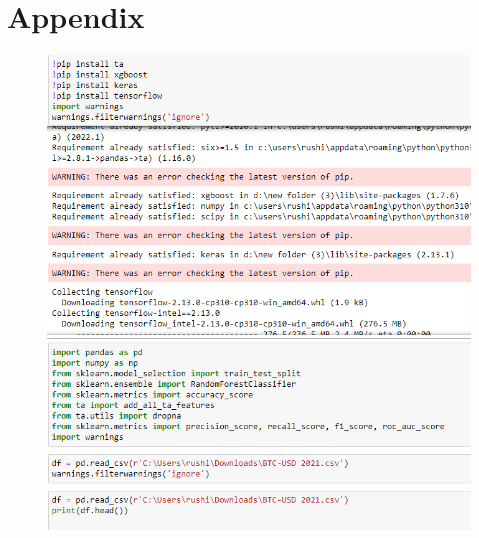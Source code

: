 
\newcommand{\A}{{\cal A}}
\newcommand{\h}{{\cal H}}
\newcommand{\s}{{\cal S}}
\newcommand{\W}{{\cal W}}
\newcommand{\BH}{\mathbf B(\cal H)}
\newcommand{\KH}{\cal  K(\cal H)}
\newcommand{\Real}{\mathbb R}
\newcommand{\Complex}{\mathbb C}
\newcommand{\Field}{\mathbb F}
\newcommand{\RPlus}{[0,\infty)}
%
\newcommand{\norm}[1]{\left\Vert#1\right\Vert}
\newcommand{\essnorm}[1]{\norm{#1}_{\text{\rm\normalshape ess}}}
\newcommand{\abs}[1]{\left\vert#1\right\vert}
\newcommand{\set}[1]{\left\{#1\right\}}
\newcommand{\seq}[1]{\left<#1\right>}
\newcommand{\eps}{\varepsilon}
\newcommand{\To}{\longrightarrow}
\newcommand{\RE}{\operatorname{Re}}
\newcommand{\IM}{\operatorname{Im}}
\newcommand{\Poly}{{\cal{P}}(E)}
\newcommand{\EssD}{{\cal{D}}}
\theoremstyle{plain}
\newtheorem{thm}{Theorem}[section]
\newtheorem{cor}[thm]{Corollary}
\newtheorem{lem}[thm]{Lemma}
\newtheorem{prop}[thm]{Proposition}

\theoremstyle{definition}
\newtheorem{defn}{Definition}[section]
%
\theoremstyle{remark}
\newtheorem{rem}{Remark}[section]
%
\def\baselinestretch{1}

\chapter{Appendix }

\def\baselinestretch{1.66}

\begin{figure}[H]
\centering
\includegraphics[scale=0.75]{fig16.jpg}

\end{figure}

